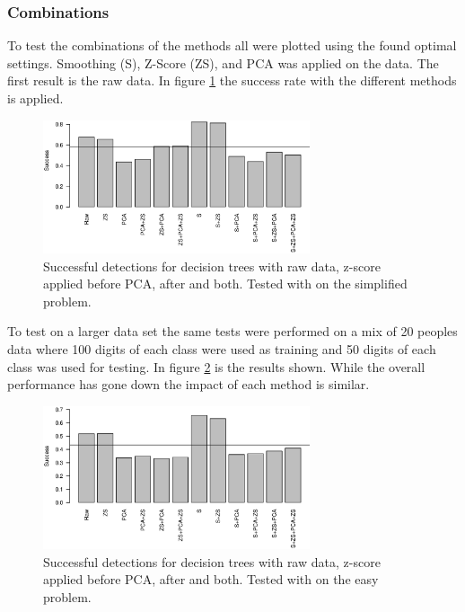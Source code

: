 \subsubsection{Combinations}

To test the combinations of the methods all were plotted using the found optimal settings.
Smoothing (S), Z-Score (ZS), and PCA was applied on the data.
The first result is the raw data.
In figure \ref{fig:tree_total} the success rate with the different methods is applied.

\begin{figure}[H]
\centering
\includegraphics[width=0.7\textwidth]{graphics/tree_total}
\caption[Success for decision tree with different applied methods. Simplified problem.]{
Successful detections for decision trees with raw data, z-score applied before PCA, after and both.
Tested with on the simplified problem.}
\label{fig:tree_total}
\end{figure}

To test on a larger data set the same tests were performed on a mix of 20 peoples data where 100 digits of each class were used as training and 50 digits of each class was used for testing.
In figure \ref{fig:tree_total_mixed} is the results shown.
While the overall performance has gone down the impact of each method is similar.

\begin{figure}[H]
\centering
\includegraphics[width=0.7\textwidth]{graphics/tree_total_mixed}
\caption[Success for decision tree with different applied methods. Easy problem.]{
Successful detections for decision trees with raw data, z-score applied before PCA, after and both.
Tested with on the easy problem.}
\label{fig:tree_total_mixed}
\end{figure}

